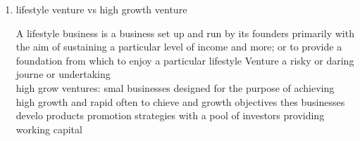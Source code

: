 \documentclass{article}
\begin{document}
\begin{enumerate}



\item lifestyle venture vs high growth venture 

 \textbullet{} A lifestyle business is a business set up and run by its founders primarily with the aim of sustaining a particular level of income and more; or to provide a foundation from which to enjoy a particular lifestyle
Venture a risky or daring journe or undertaking \\
\textbullet{} high grow ventures:
smal businesses designed for the purpose of achieving high growth and rapid often to chieve and growth objectives thes businesses develo products promotion strategies with a pool of investors providing working capital

 






\end{enumerate}
\end{document}

